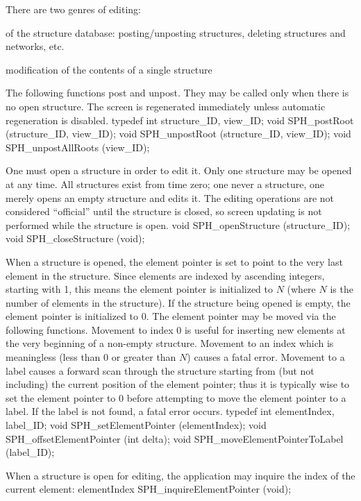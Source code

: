 \newpar
There are two genres of editing:

\bullitem {} of the structure database:
posting/unposting structures, deleting structures and networks, etc.

\bullitem {} modification
of the contents of a single structure


The following functions post and unpost.  They may be called only when there
is no open structure.  The screen is regenerated immediately unless
automatic regeneration is disabled.
\begincode
typedef int structure_ID, view_ID;
void SPH_postRoot (structure_ID, view_ID);
void SPH_unpostRoot (structure_ID, view_ID);
void SPH_unpostAllRoots (view_ID);
\endcode


One must open a structure in order to edit it.  Only one structure may
be opened at any time.  All structures exist from time zero; one never
 a structure, one merely opens an empty structure and edits
it.  The editing operations are not considered ``official'' until the
structure is closed, so screen updating is not performed while the
structure is open.
\begincode
void SPH_openStructure (structure_ID);
void SPH_closeStructure (void);
\endcode

\newpar
When a structure is opened, the element pointer is set to point to the very
last element in the structure.  Since elements are indexed by ascending
integers, starting with 1, this means the element pointer is initialized to $N$
(where $N$ is the number of elements in the structure).  If the structure being
opened is empty, the element pointer is initialized to 0.  The element pointer
may be moved via the following functions.  Movement to index 0 is useful for
inserting new elements at the very beginning of a non-empty structure.
Movement to an index which is meaningless (less than 0 or greater than $N$)
causes a fatal error.  Movement to a label causes a forward scan through the
structure starting from (but not including) the current position of the
element pointer; thus it is typically wise to set the element pointer to 0
before attempting to move the element pointer to a label.  If the label is not
found, a fatal error occurs.
\begincode
typedef int elementIndex, label_ID;
void SPH_setElementPointer (elementIndex);
void SPH_offsetElementPointer (int delta);
void SPH_moveElementPointerToLabel (label_ID);
\endcode

\newpar
When a structure is open for editing, the application may inquire the
index of the current element:
\begincode
elementIndex SPH_inquireElementPointer (void);
\endcode

